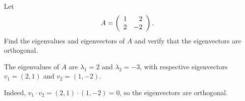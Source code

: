\documentclass{ximera}
\begin{document}
\begin{exercise} \label{c7.7.2}
Let
\[
A=\left(\begin{array}{rr} 1 & 2\\ 2 &-2\end{array}\right).
\]
Find the eigenvalues and eigenvectors of $A$ and verify that the eigenvectors
are orthogonal.

\begin{solution}

\ans The eigenvalues of $A$ are $\lambda_1 = 2$ and $\lambda_2 = -3$,
with respective eigenvectors $v_1 = (2,1)$ and $v_2 = (1,-2)$.

\soln Indeed, $v_1 \cdot v_2 = (2,1) \cdot (1,-2) = 0$, so the
eigenvectors are orthogonal.

\end{solution}
\end{exercise}
\end{document}
